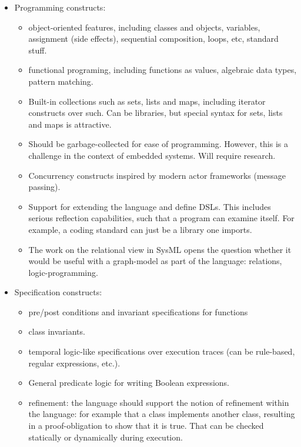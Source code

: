 \documentclass{llncs}
\begin{document}
\begin{itemize}
  \item Programming constructs:
    \begin{itemize}
      \item object-oriented features, including classes and objects,
        variables, assignment (side effects), sequential composition,
        loops, etc, standard stuff.
      \item functional programing, including functions as values,
        algebraic data types, pattern matching.
      \item Built-in collections such as sets, lists and maps,
        including iterator constructs over such.  Can be libraries,
        but special syntax for sets, lists and maps is attractive.
      \item Should be garbage-collected for ease of
        programming. However, this is a challenge in the context of
        embedded systems. Will require research.
      \item Concurrency constructs inspired by modern actor frameworks
        (message passing).
      \item Support for extending the language and define DSLs. This
        includes serious reflection capabilities, such that a program
        can examine itself. For example, a coding standard can just be
        a library one imports.
      \item The work on the relational view in SysML opens the
        question whether it would be useful with a graph-model as part
        of the language: relations, logic-programming.
    \end{itemize}
 
  \item Specification constructs:
    \begin{itemize}
      \item pre/post conditions and invariant specifications for functions
      \item class invariants.
      \item temporal logic-like specifications over execution traces
        (can be rule-based, regular expressions, etc.).
      \item General predicate logic for writing Boolean expressions.
      \item refinement: the language should support the notion of
        refinement within the language: for example that a class
        implements another class, resulting in a proof-obligation to
        show that it is true. That can be checked statically or
        dynamically during execution.
    \end{itemize}
\end{itemize}
\end{document}
